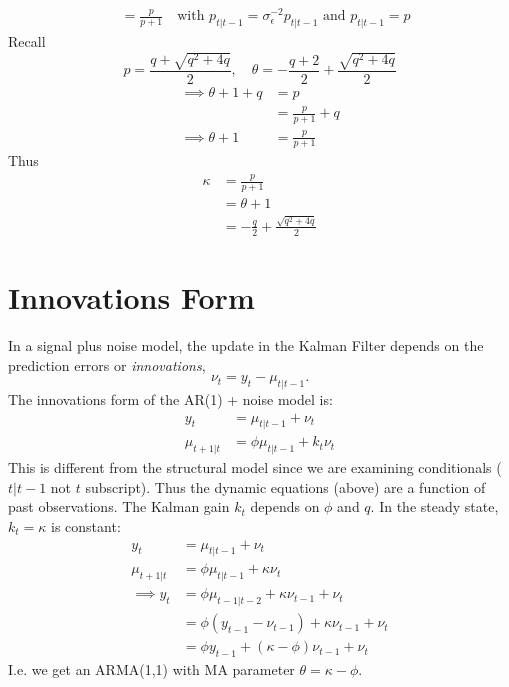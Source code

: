 \documentclass[DIV=14,titlepage=false]{scrreprt}
\begin{document}
\begin{example}[$\phi = 1$]
\begin{align*}
    &= \frac{p}{p+1} \quad \text{with $p_{t|t-1} = \sigma^{-2}_\epsilon p_{t|t-1}$ and $p_{t|t-1} = p$}
\end{align*}
Recall
\[
    p = \frac{q+\sqrt{q^2+4q}}{2}, \quad \theta = -\frac{q+2}{2} + \frac{\sqrt{q^2+4q}}{2}
\]
\begin{align*}
    \implies \theta +1 +q &= p\\
    &= \frac{p}{p+1} + q\\
    \implies \theta + 1 &= \frac{p}{p+1}
\end{align*}
Thus
\begin{align*}
    \kappa &= \frac{p}{p+1}\\
    &= \theta + 1\\
    &= -\frac{q}{2} + \frac{\sqrt{q^2+4q}}{2}
\end{align*}
\end{example}
\section{Innovations Form}
In a signal plus noise model, the update in the Kalman Filter depends on the prediction errors or \textit{innovations},
\[
    \nu_t = y_t - \mu_{t|t-1}.
\] 
The innovations form of the AR(1) + noise model is:
\begin{align*}
    y_t &= \mu_{t|t-1} + \nu_t\\
    \mu_{t+1|t} &= \phi \mu_{t|t-1} + k_t \nu_t
\end{align*}
This is different from the structural model since we are examining conditionals ($t|t-1$ not $t$ subscript). Thus the dynamic equations (above) are a function of past observations. The Kalman gain $k_t$ depends on $\phi$ and $q$. In the steady state, $k_t = \kappa$ is constant:
\begin{align*}
    y_t &= \mu_{t|t-1} + \nu_t\\
    \mu_{t+1|t} &= \phi \mu_{t|t-1} + \kappa \nu_t\\
    \implies y_t &= \phi \mu_{t-1|t-2} + \kappa \nu_{t-1} + \nu_t\\
    &= \phi(y_{t-1} - \nu_{t-1}) + \kappa \nu_{t-1} + \nu_t\\
    &= \phi y_{t-1} + (\kappa - \phi) \nu_{t-1} + \nu_t
\end{align*}
I.e. we get an ARMA(1,1) with MA parameter $\theta = \kappa - \phi$.
\end{document}
